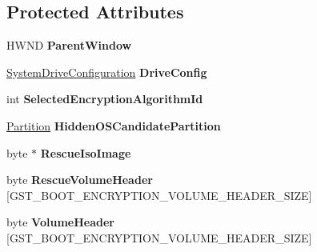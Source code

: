 \subsection*{Protected Attributes}
\begin{DoxyCompactItemize}
\item 
\mbox{\label{class_gost_crypt_1_1_boot_encryption_ae6edc653fe4eb5475bcc5b47712a7b72}} 
H\+W\+ND {\bfseries Parent\+Window}
\item 
\mbox{\label{class_gost_crypt_1_1_boot_encryption_a76407c456bd5cdc2608e9e2b8c5dfdc9}} 
\hyperlink{struct_gost_crypt_1_1_system_drive_configuration}{System\+Drive\+Configuration} {\bfseries Drive\+Config}
\item 
\mbox{\label{class_gost_crypt_1_1_boot_encryption_adea0a52cca4fcad8a2e4ab130adb5009}} 
int {\bfseries Selected\+Encryption\+Algorithm\+Id}
\item 
\mbox{\label{class_gost_crypt_1_1_boot_encryption_ae133872d6612a2e304396d461438d75e}} 
\hyperlink{struct_gost_crypt_1_1_partition}{Partition} {\bfseries Hidden\+O\+S\+Candidate\+Partition}
\item 
\mbox{\label{class_gost_crypt_1_1_boot_encryption_ae1d0b4c96ce088d4d557e0defd8d2495}} 
byte $\ast$ {\bfseries Rescue\+Iso\+Image}
\item 
\mbox{\label{class_gost_crypt_1_1_boot_encryption_ac26525a33e321ff2ebb2680b4bca475f}} 
byte {\bfseries Rescue\+Volume\+Header} \mbox{[}G\+S\+T\+\_\+\+B\+O\+O\+T\+\_\+\+E\+N\+C\+R\+Y\+P\+T\+I\+O\+N\+\_\+\+V\+O\+L\+U\+M\+E\+\_\+\+H\+E\+A\+D\+E\+R\+\_\+\+S\+I\+ZE\mbox{]}
\item 
\mbox{\label{class_gost_crypt_1_1_boot_encryption_a2d7636557943017c6c1566eebd721caa}} 
byte {\bfseries Volume\+Header} \mbox{[}G\+S\+T\+\_\+\+B\+O\+O\+T\+\_\+\+E\+N\+C\+R\+Y\+P\+T\+I\+O\+N\+\_\+\+V\+O\+L\+U\+M\+E\+\_\+\+H\+E\+A\+D\+E\+R\+\_\+\+S\+I\+ZE\mbox{]}
\item 
\mbox{\label{class_gost_crypt_1_1_boot_encryption_ad8e588342177effdd4f10adb817c1631}} 

\end{DoxyCompactItemize}
